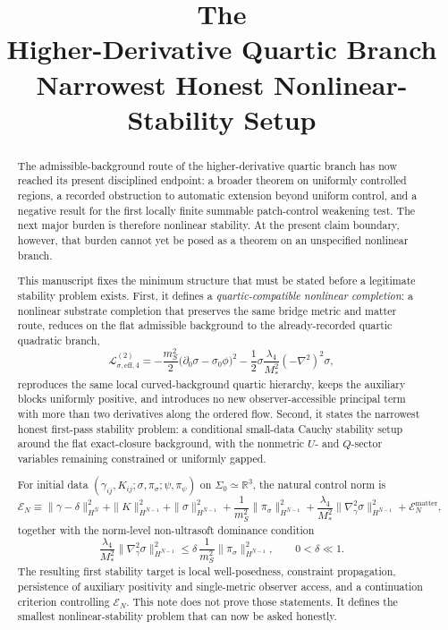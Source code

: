 \documentclass[11pt]{article}
\title{\textbf{The \TheoryName{}}\\[0.4em]
\large Higher-Derivative Quartic Branch Narrowest Honest Nonlinear-Stability Setup}
\author{}
\date{}
\begin{document}
\maketitle

\begin{abstract}
The admissible-background route of the higher-derivative quartic branch has now reached its present disciplined endpoint: a broader theorem on uniformly controlled regions, a recorded obstruction to automatic extension beyond uniform control, and a negative result for the first locally finite summable patch-control weakening test. The next major burden is therefore nonlinear stability. At the present claim boundary, however, that burden cannot yet be posed as a theorem on an unspecified nonlinear branch.

This manuscript fixes the minimum structure that must be stated before a legitimate stability problem exists. First, it defines a \emph{quartic-compatible nonlinear completion}: a nonlinear substrate completion that preserves the same bridge metric and matter route, reduces on the flat admissible background to the already-recorded quartic quadratic branch,
\[
\mathcal L_{\sigma,\mathrm{eff},4}^{(2)}
=
-\frac{m_S^2}{2}\bigl(\partial_0\sigma-\sigma_0\phi\bigr)^2
-\frac{1}{2}\sigma \frac{\lambda_4}{M_*^2}(-\nabla^2)^2 \sigma,
\]
reproduces the same local curved-background quartic hierarchy, keeps the auxiliary blocks uniformly positive, and introduces no new observer-accessible principal term with more than two derivatives along the ordered flow. Second, it states the narrowest honest first-pass stability problem: a conditional small-data Cauchy stability setup around the flat exact-closure background, with the nonmetric \(U\)- and \(Q\)-sector variables remaining constrained or uniformly gapped.

For initial data \((\gamma_{ij},K_{ij};\sigma,\pi_\sigma;\psi,\pi_\psi)\) on \(\Sigma_0\simeq\mathbb R^3\), the natural control norm is
\[
\mathcal E_N
\equiv
\|\gamma-\delta\|_{H^N}^2
+ \|K\|_{H^{N-1}}^2
+ \|\sigma\|_{H^{N-1}}^2
+ \frac{1}{m_S^2}\|\pi_\sigma\|_{H^{N-1}}^2
+ \frac{\lambda_4}{M_*^2}\|\nabla_\gamma^2 \sigma\|_{H^{N-1}}^2
+ \mathcal E_N^{\mathrm{matter}},
\]
together with the norm-level non-ultrasoft dominance condition
\[
\frac{\lambda_4}{M_*^2}\|\nabla_\gamma^2 \sigma\|_{H^{N-1}}^2
\le
\delta\,
\frac{1}{m_S^2}\|\pi_\sigma\|_{H^{N-1}}^2,
\qquad
0<\delta\ll 1.
\]
The resulting first stability target is local well-posedness, constraint propagation, persistence of auxiliary positivity and single-metric observer access, and a continuation criterion controlling \(\mathcal E_N\). This note does not prove those statements. It defines the smallest nonlinear-stability problem that can now be asked honestly.
\end{abstract}
\end{document}
